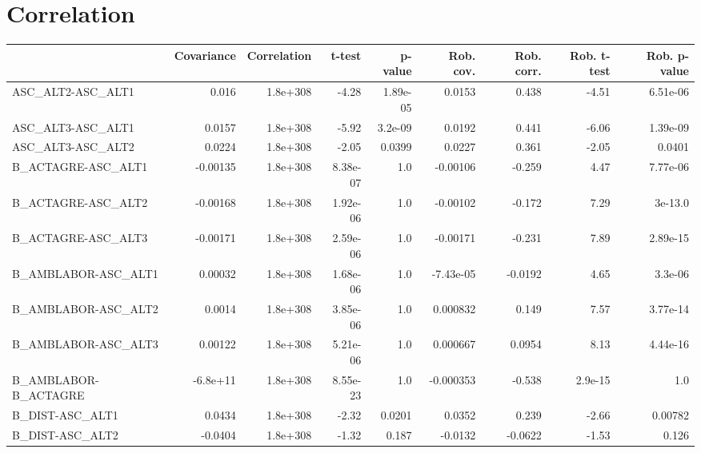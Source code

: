 \section{Correlation}
\begin{tabular}{lrrrrrrrr}
\toprule
{} &  Covariance &  Correlation &    t-test &  p-value &  Rob. cov. &  Rob. corr. &  Rob. t-test &  Rob. p-value \\
\midrule
ASC\_ALT2-ASC\_ALT1             &       0.016 &     1.8e+308 &     -4.28 & 1.89e-05 &     0.0153 &       0.438 &        -4.51 &      6.51e-06 \\
ASC\_ALT3-ASC\_ALT1             &      0.0157 &     1.8e+308 &     -5.92 &  3.2e-09 &     0.0192 &       0.441 &        -6.06 &      1.39e-09 \\
ASC\_ALT3-ASC\_ALT2             &      0.0224 &     1.8e+308 &     -2.05 &   0.0399 &     0.0227 &       0.361 &        -2.05 &        0.0401 \\
B\_ACTAGRE-ASC\_ALT1            &    -0.00135 &     1.8e+308 &  8.38e-07 &      1.0 &   -0.00106 &      -0.259 &         4.47 &      7.77e-06 \\
B\_ACTAGRE-ASC\_ALT2            &    -0.00168 &     1.8e+308 &  1.92e-06 &      1.0 &   -0.00102 &      -0.172 &         7.29 &       3e-13.0 \\
B\_ACTAGRE-ASC\_ALT3            &    -0.00171 &     1.8e+308 &  2.59e-06 &      1.0 &   -0.00171 &      -0.231 &         7.89 &      2.89e-15 \\
B\_AMBLABOR-ASC\_ALT1           &     0.00032 &     1.8e+308 &  1.68e-06 &      1.0 &  -7.43e-05 &     -0.0192 &         4.65 &       3.3e-06 \\
B\_AMBLABOR-ASC\_ALT2           &      0.0014 &     1.8e+308 &  3.85e-06 &      1.0 &   0.000832 &       0.149 &         7.57 &      3.77e-14 \\
B\_AMBLABOR-ASC\_ALT3           &     0.00122 &     1.8e+308 &  5.21e-06 &      1.0 &   0.000667 &      0.0954 &         8.13 &      4.44e-16 \\
B\_AMBLABOR-B\_ACTAGRE          &    -6.8e+11 &     1.8e+308 &  8.55e-23 &      1.0 &  -0.000353 &      -0.538 &      2.9e-15 &           1.0 \\
B\_DIST-ASC\_ALT1               &      0.0434 &     1.8e+308 &     -2.32 &   0.0201 &     0.0352 &       0.239 &        -2.66 &       0.00782 \\
B\_DIST-ASC\_ALT2               &     -0.0404 &     1.8e+308 &     -1.32 &    0.187 &    -0.0132 &     -0.0622 &        -1.53 &         0.126 \\

\end{tabular}
